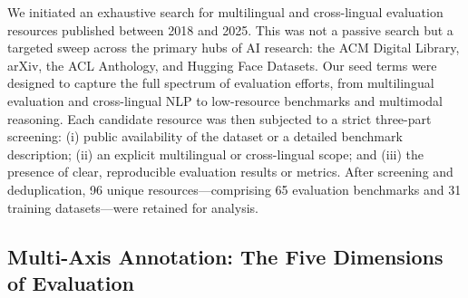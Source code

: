 \documentclass[acmsmall]{acmart}
\begin{document}
We initiated an exhaustive search for multilingual and cross-lingual evaluation resources published between 2018 and 2025. This was not a passive search but a targeted sweep across the primary hubs of AI research: the ACM Digital Library, arXiv, the ACL Anthology, and Hugging Face Datasets. Our seed terms were designed to capture the full spectrum of evaluation efforts, from multilingual evaluation and cross-lingual NLP to low-resource benchmarks and multimodal reasoning. Each candidate resource was then subjected to a strict three-part screening: (i) public availability of the dataset or a detailed benchmark description; (ii) an explicit multilingual or cross-lingual scope; and (iii) the presence of clear, reproducible evaluation results or metrics. After screening and deduplication, 96 unique resources—comprising 65 evaluation benchmarks and 31 training datasets—were retained for analysis.

\subsection{Multi-Axis Annotation: The Five Dimensions of Evaluation}
\end{document}
